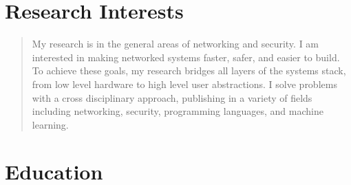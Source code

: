 \documentclass[a4paper,11pt]{article}
\begin{document}
\maketitle


\section{\LARGE Research Interests}
\begin{quote}
My research is in the general areas of networking and security. I am interested in making networked systems faster, safer, and easier to build. To achieve these goals, my research bridges all layers of the systems stack, from low level hardware to high level user abstractions. I solve problems with a cross disciplinary approach, publishing in a variety of fields including networking, security, programming languages, and machine learning.
\end{quote}




\section{\LARGE Education}
\end{document}
